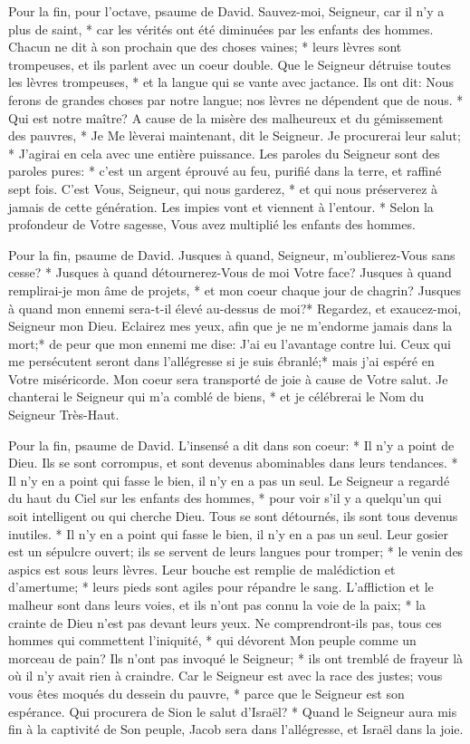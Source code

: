Pour la fin, pour l'octave, psaume de David.
Sauvez-moi, Seigneur, car il n'y a plus de saint, * car les vérités ont été diminuées par les enfants des hommes.
Chacun ne dit à son prochain que des choses vaines; * leurs lèvres sont trompeuses, et ils parlent avec un coeur double.
Que le Seigneur détruise toutes les lèvres trompeuses, * et la langue qui se vante avec jactance.
Ils ont dit: Nous ferons de grandes choses par notre langue; nos lèvres ne dépendent que de nous. * Qui est notre maître?
A cause de la misère des malheureux et du gémissement des pauvres, * Je Me lèverai maintenant, dit le Seigneur. Je procurerai leur salut; * J'agirai en cela avec une entière puissance.
Les paroles du Seigneur sont des paroles pures: * c'est un argent éprouvé au feu, purifié dans la terre, et raffiné sept fois.
C'est Vous, Seigneur, qui nous garderez, * et qui nous préserverez à jamais de cette génération.
Les impies vont et viennent à l'entour. * Selon la profondeur de Votre sagesse, Vous avez multiplié les enfants des hommes.

Pour la fin, psaume de David. Jusques à quand, Seigneur, m'oublierez-Vous sans cesse? * Jusques à quand détournerez-Vous de moi Votre face?
Jusques à quand remplirai-je mon âme de projets, * et mon coeur chaque jour de chagrin?
Jusques à quand mon ennemi sera-t-il élevé au-dessus de moi?*
Regardez, et exaucez-moi, Seigneur mon Dieu. Eclairez mes yeux, afin que je ne m'endorme jamais dans la mort;*
de peur que mon ennemi me dise: J'ai eu l'avantage contre lui. Ceux qui me persécutent seront dans l'allégresse si je suis ébranlé;*
mais j'ai espéré en Votre miséricorde. Mon coeur sera transporté de joie à cause de Votre salut. Je chanterai le Seigneur qui m'a comblé de biens, * et je célébrerai le Nom du Seigneur Très-Haut.

Pour la fin, psaume de David. L'insensé a dit dans son coeur: * Il n'y a point de Dieu. Ils se sont corrompus, et sont devenus abominables dans leurs tendances. * Il n'y en a point qui fasse le bien, il n'y en a pas un seul.
Le Seigneur a regardé du haut du Ciel sur les enfants des hommes, * pour voir s'il y a quelqu'un qui soit intelligent ou qui cherche Dieu.
Tous se sont détournés, ils sont tous devenus inutiles. * Il n'y en a point qui fasse le bien, il n'y en a pas un seul. Leur gosier est un sépulcre ouvert; ils se servent de leurs langues pour tromper; * le venin des aspics est sous leurs lèvres. Leur bouche est remplie de malédiction et d'amertume; * leurs pieds sont agiles pour répandre le sang. L'affliction et le malheur sont dans leurs voies, et ils n'ont pas connu la voie de la paix; * la crainte de Dieu n'est pas devant leurs yeux.
Ne comprendront-ils pas, tous ces hommes qui commettent l'iniquité, * qui dévorent Mon peuple comme un morceau de pain?
Ils n'ont pas invoqué le Seigneur; * ils ont tremblé de frayeur là où il n'y avait rien à craindre.
Car le Seigneur est avec la race des justes; vous vous êtes moqués du dessein du pauvre, * parce que le Seigneur est son espérance.
Qui procurera de Sion le salut d'Israël? * Quand le Seigneur aura mis fin à la captivité de Son peuple, Jacob sera dans l'allégresse, et Israël dans la joie.

